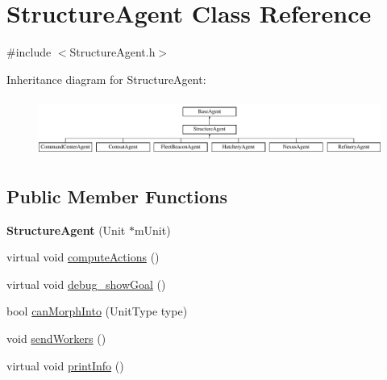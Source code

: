 \hypertarget{class_structure_agent}{\section{Structure\-Agent Class Reference}
\label{class_structure_agent}
}


{\ttfamily \#include $<$Structure\-Agent.\-h$>$}

Inheritance diagram for Structure\-Agent\-:\begin{figure}[H]
\begin{center}
\leavevmode
\includegraphics[height=1.917808cm]{class_structure_agent}
\end{center}
\end{figure}
\subsection*{Public Member Functions}
\begin{DoxyCompactItemize}
\item 
\hypertarget{class_structure_agent_aaca41a2576d63446730c75241ebc00c0}{{\bfseries Structure\-Agent} (Unit $\ast$m\-Unit)}\label{class_structure_agent_aaca41a2576d63446730c75241ebc00c0}

\item 
virtual void \hyperlink{class_structure_agent_abaf0a18b1a60aa15af603b3470823a07}{compute\-Actions} ()
\item 
virtual void \hyperlink{class_structure_agent_a64cbd21350ebb2c69b2f95108bcff775}{debug\-\_\-show\-Goal} ()
\item 
bool \hyperlink{class_structure_agent_a5fd9a870537fa4db414cb4b8c2b0177c}{can\-Morph\-Into} (Unit\-Type type)
\item 
void \hyperlink{class_structure_agent_acb2fd9dac6c1262016e76ebfc210749b}{send\-Workers} ()
\item 
virtual void \hyperlink{class_structure_agent_adac3c70b613e6d10ac921e11bb89b633}{print\-Info} ()
\end{DoxyCompactItemize}
